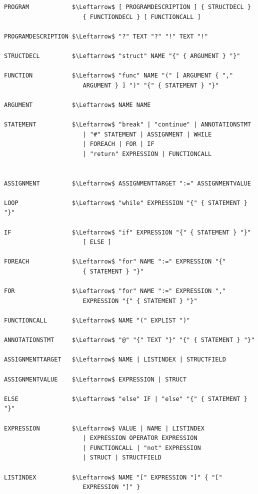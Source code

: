 \begin{lstlisting}[caption={Gourmet's grammar in EBNF notation.}, captionpos=b, label={The EBNF grammar of the Gourmet programming language.}]
PROGRAM            $\Leftarrow$ [ PROGRAMDESCRIPTION ] { STRUCTDECL }
                      { FUNCTIONDECL } [ FUNCTIONCALL ]

PROGRAMDESCRIPTION $\Leftarrow$ "?" TEXT "?" "!" TEXT "!"

STRUCTDECL         $\Leftarrow$ "struct" NAME "{" { ARGUMENT } "}"

FUNCTION           $\Leftarrow$ "func" NAME "(" [ ARGUMENT { ","
                      ARGUMENT } ] ")" "{" { STATEMENT } "}"

ARGUMENT           $\Leftarrow$ NAME NAME

STATEMENT          $\Leftarrow$ "break" | "continue" | ANNOTATIONSTMT
                      | "#" STATEMENT | ASSIGNMENT | WHILE
                      | FOREACH | FOR | IF
                      | "return" EXPRESSION | FUNCTIONCALL


ASSIGNMENT         $\Leftarrow$ ASSIGNMENTTARGET ":=" ASSIGNMENTVALUE

LOOP               $\Leftarrow$ "while" EXPRESSION "{" { STATEMENT } "}"

IF                 $\Leftarrow$ "if" EXPRESSION "{" { STATEMENT } "}"
                      [ ELSE ]

FOREACH            $\Leftarrow$ "for" NAME ":=" EXPRESSION "{"
                      { STATEMENT } "}"

FOR                $\Leftarrow$ "for" NAME ":=" EXPRESSION ","
                      EXPRESSION "{" { STATEMENT } "}"

FUNCTIONCALL       $\Leftarrow$ NAME "(" EXPLIST ")"

ANNOTATIONSTMT     $\Leftarrow$ "@" "{" TEXT "}" "{" { STATEMENT } "}"

ASSIGNMENTTARGET   $\Leftarrow$ NAME | LISTINDEX | STRUCTFIELD

ASSIGNMENTVALUE    $\Leftarrow$ EXPRESSION | STRUCT

ELSE               $\Leftarrow$ "else" IF | "else" "{" { STATEMENT } "}"

EXPRESSION         $\Leftarrow$ VALUE | NAME | LISTINDEX
                      | EXPRESSION OPERATOR EXPRESSION
                      | FUNCTIONCALL | "not" EXPRESSION
                      | STRUCT | STRUCTFIELD

LISTINDEX          $\Leftarrow$ NAME "[" EXPRESSION "]" { "["
                      EXPRESSION "]" }


\end{lstlisting}
